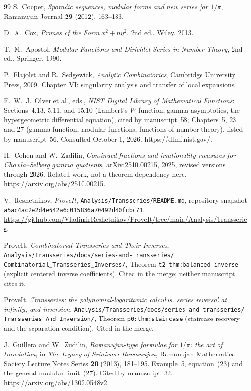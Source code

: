 \documentclass[11pt,letterpaper]{article}
\newcommand{\file}[1]{\nolinkurl{#1}}
\theoremstyle{remark}\newtheorem{remark}[theorem]{Remark}
\newcounter{l7gtrsavedeq}
\begin{document}
\begin{thebibliography}{99}
S.~Cooper,
\emph{Sporadic sequences, modular forms and new series for $1/\pi$},
Ramanujan Journal \textbf{29} (2012), 163--183.

D.~A.~Cox,
\emph{Primes of the Form $x^2+ny^2$}, 2nd ed.,
Wiley, 2013.

T.~M.~Apostol,
\emph{Modular Functions and Dirichlet Series in Number Theory},
2nd ed., Springer, 1990.

P.~Flajolet and R.~Sedgewick, \emph{Analytic Combinatorics}, Cambridge
University Press, 2009. Chapter~VI: singularity analysis and transfer
of local expansions.

F.~W.~J.~Olver et al., eds., \emph{NIST Digital Library of Mathematical
Functions}: Sections~4.13, 5.11, and 15.10 (Lambert's $W$ function,
gamma asymptotics, the hypergeometric differential equation), cited by
manuscript~58; Chapters~5, 23 and 27 (gamma function, modular functions,
functions of number theory), listed by manuscript~56.
Consulted October 1, 2026.
\url{https://dlmf.nist.gov/}.

H.~Cohen and W.~Zudilin,
\emph{Continued fractions and irrationality measures for
Chowla--Selberg gamma quotients}, arXiv:2510.00215, 2025, revised
versions through 2026. Related work, not a theorem dependency here.
\url{https://arxiv.org/abs/2510.00215}.

V.~Reshetnikov, \emph{ProveIt},
\file{Analysis/Transseries/README.md}, repository snapshot
\texttt{a5ad4ac2e2d4e642a6c015836a70492d40fcbc71}.
\url{https://github.com/VladimirReshetnikov/ProveIt/tree/main/Analysis/Transseries}.

ProveIt, \emph{Combinatorial Transseries and Their Inverses},
\file{Analysis/Transseries/docs/series-and-transseries/}
\file{Combinatorial_Transseries_Inverses/}, Theorem
\texttt{t2:thm:balanced-inverse} (explicit centered inverse
coefficients). Cited in the merge; neither manuscript cites it.

ProveIt, \emph{Transseries: the polynomial-logarithmic calculus, series
reversal at infinity, and inversion},
\file{Analysis/Transseries/docs/series-and-transseries/}
\file{Transseries_And_Inversion/}, Theorem \texttt{p0:thm:staircase}
(staircase recovery and the separation condition). Cited in the merge.

J.~Guillera and W.~Zudilin,
\emph{Ramanujan-type formulae for $1/\pi$: the art of translation}, in
\emph{The Legacy of Srinivasa Ramanujan}, Ramanujan Mathematical Society
Lecture Notes Series \textbf{20} (2013), 181--195. Example~5, equation~(23)
and the general modular limit~(27). Cited by manuscript~32.
\url{https://arxiv.org/abs/1302.0548v2}.


\end{thebibliography}
\end{document}
